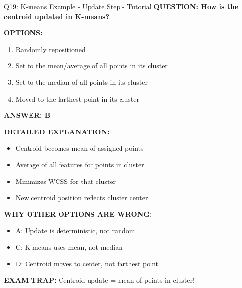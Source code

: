 \documentclass[8pt]{beamer}
\begin{document}
	\begin{frame}{Q19: K-means Example - Update Step - Tutorial}
		\fontsize{6.5}{7.5}\selectfont
		\textbf{QUESTION: How is the centroid updated in K-means?}
		
		\vspace{0.1cm}
		\textbf{OPTIONS:}
		\begin{enumerate}
			\item Randomly repositioned
			\item Set to the mean/average of all points in its cluster
			\item Set to the median of all points in its cluster
			\item Moved to the farthest point in its cluster
		\end{enumerate}
		
		\vspace{0.1cm}
		\textcolor{myblue}{\textbf{ANSWER: B}}
		
		\vspace{0.1cm}
		\textbf{DETAILED EXPLANATION:}
		\begin{itemize}
			\item Centroid becomes mean of assigned points
			\item Average of all features for points in cluster
			\item Minimizes WCSS for that cluster
			\item New centroid position reflects cluster center
		\end{itemize}
		
		\vspace{0.1cm}
		\textcolor{myred}{\textbf{WHY OTHER OPTIONS ARE WRONG:}}
		\begin{itemize}
			\item \textcolor{myred}{A:} Update is deterministic, not random
			\item \textcolor{myred}{C:} K-means uses mean, not median
			\item \textcolor{myred}{D:} Centroid moves to center, not farthest point
		\end{itemize}
		
		\textcolor{myred}{\textbf{EXAM TRAP:}} Centroid update = \textcolor{myblue}{mean of points in cluster}!
	\end{frame}
	
\end{document}
